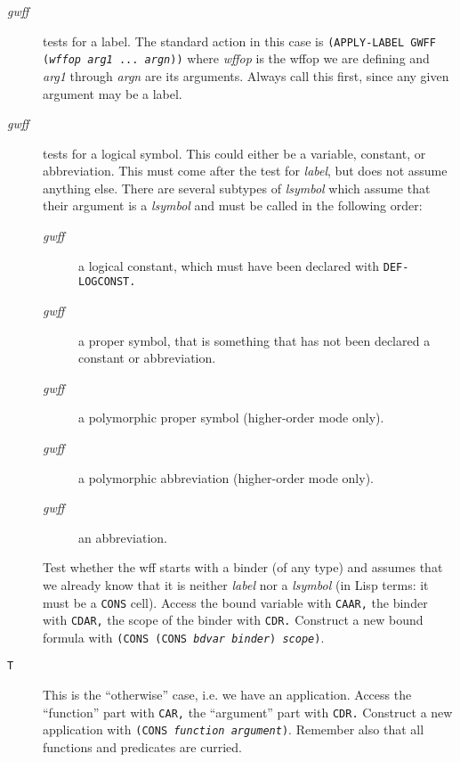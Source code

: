 \begin{description}
\item [ {\it gwff}] tests for a label.  The standard action in this
case is {\tt (APPLY-LABEL GWFF ({\it wffop} {\it arg1} ... {\it argn}))} where
{\it wffop} is the wffop we are defining and {\it arg1} through {\it argn} are
its arguments. Always call this first, since any given argument may be a label.

\item [ {\it gwff}] tests for a logical symbol.  This could either
be a variable, constant, or abbreviation. This must come after the test for {\it label}, 
but does not assume anything else.  There are several subtypes of {\it lsymbol} which
assume that their argument is a {\it lsymbol} and must be called in the
following order:
\begin{description}
\item [ {\it gwff}] a logical constant, which must have been declared
with {\tt DEF-LOGCONST.}

\item [ {\it gwff}] a proper symbol, that is something that has not
been declared a constant or abbreviation.

\item [ {\it gwff}] a polymorphic proper symbol (higher-order mode only).

\item [ {\it gwff}] a polymorphic abbreviation (higher-order mode only).

\item [ {\it gwff} ] an abbreviation.
\end{description}

\item [] 
Test whether the wff starts with a binder (of any type) and
assumes that we already know that it is neither {\it label} nor
a {\it lsymbol} (in Lisp terms: it must be a {\tt CONS} cell). Access the
bound variable with {\tt CAAR,} the binder with {\tt CDAR,} the scope of the binder
with {\tt CDR.}  Construct a new bound formula with {\tt (CONS (CONS {\it bdvar} {\it binder})
{\it scope})}.

\item [{\tt T}] This is the ``otherwise'' case, i.e. we have an application.
Access the ``function'' part with {\tt CAR,} the ``argument'' part with
{\tt CDR.}  Construct a new application with {\tt (CONS {\it function} {\it argument})}.
Remember also that all functions and predicates are curried.

\end{description}

